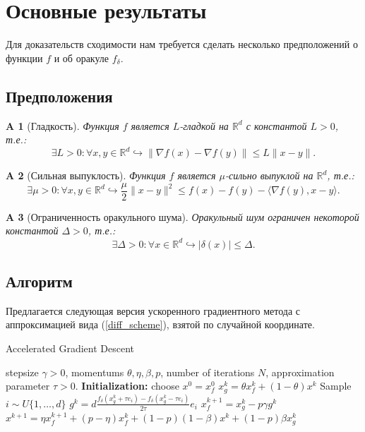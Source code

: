 \documentclass{article}
\newtheorem{assumption}{A}
\begin{document}
\section{Основные результаты}
Для доказательств сходимости нам требуется сделать несколько предположений о функции $f$ и об оракуле $f_\delta$.
\subsection{Предположения}
\begin{assumption}[Гладкость]\label{A1}
 Функция $f$ является $L$-гладкой на $\mathbb{R}^d$ с константой $L > 0$, т.е.:
 \begin{equation}
  \exists L > 0: \forall x, y \in \mathbb{R}^d \hookrightarrow \|\nabla f(x) - \nabla f(y)\| \leqslant L \|x - y\|.
  \label{l_smoothness}
 \end{equation}
\end{assumption}

\begin{assumption}[Сильная выпуклость]\label{A2}
 Функция $f$ является $ \mu$-сильно выпуклой на $\mathbb{R}^d$, т.е.:
 \begin{equation}
  \exists \mu > 0: \forall x, y \in \mathbb{R}^d \hookrightarrow \frac{\mu}{2}\|x - y\|^2 \leqslant f(x) - f(y) - \langle \nabla f(y), x - y \rangle.
  \label{mu_strongly_convexity}
 \end{equation}
\end{assumption}


\begin{assumption}[Ограниченность оракульного шума]\label{A3}
 Оракульный шум ограничен некоторой константой $\Delta > 0$, т.е.:
 \begin{equation}
  \exists \Delta > 0: \forall x \in \mathbb{R}^d \hookrightarrow |\delta(x)| \leqslant \Delta.
  \label{bounded_oracle_noise}
 \end{equation}
\end{assumption}


\subsection{Алгоритм}
Предлагается следующая версия ускоренного градиентного метода с аппроксимацией вида (\ref{diff_scheme}), взятой по случайной координате.
\begin{algorithm}[!ht]
\caption{ Accelerated Gradient Descent }\label{agd_algorithm}
\begin{algorithmic}[1]
   \REQUIRE stepsize $\gamma > 0$, momentums $\theta, \eta, \beta, p$, number of iterations $N$, approximation parameter $\tau > 0$.
   \textbf{Initialization:} choose $x^0 = x_f^0$
		\STATE $x_g^k = \theta x_f^k + (1 - \theta)x^k$
		\STATE Sample $i \sim U\{1, \dots, d\}$
		\STATE $g^k = d\frac{f_\delta(x_g^k + \tau e_i) - f_\delta(x_g^k - \tau e_i)}{2\tau}e_i$
		\STATE $x_f^{k + 1} = x_g^k - p \gamma g^k$
		\STATE $x^{k + 1} = \eta x_f^{k + 1} + (p - \eta) x_f^k + (1 - p)(1 - \beta) x^k + (1 - p)\beta x_g^k$
   \ENDFOR
\end{algorithmic}
\end{algorithm}
\end{document}
